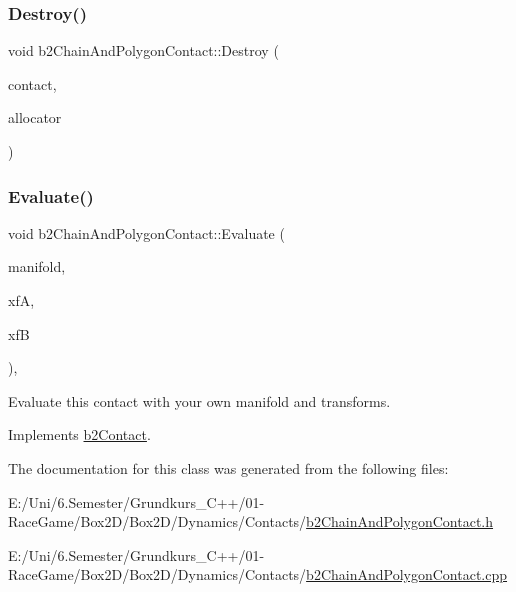 \mbox{\label{classb2_chain_and_polygon_contact_aa31bf71d64dd78583505b6da76ef289c}} 
\subsubsection{\texorpdfstring{Destroy()}{Destroy()}}
{\footnotesize\ttfamily void b2\+Chain\+And\+Polygon\+Contact\+::\+Destroy (\begin{DoxyParamCaption}\item[{\mbox{\hyperlink{classb2_contact}{b2\+Contact}} $\ast$}]{contact,  }\item[{\mbox{\hyperlink{classb2_block_allocator}{b2\+Block\+Allocator}} $\ast$}]{allocator }\end{DoxyParamCaption})\hspace{0.3cm}{\ttfamily [static]}}

\mbox{\label{classb2_chain_and_polygon_contact_a607e7a8b4b0a5ee9bfd100a365fb6f3b}} 
\subsubsection{\texorpdfstring{Evaluate()}{Evaluate()}}
{\footnotesize\ttfamily void b2\+Chain\+And\+Polygon\+Contact\+::\+Evaluate (\begin{DoxyParamCaption}\item[{\mbox{\hyperlink{structb2_manifold}{b2\+Manifold}} $\ast$}]{manifold,  }\item[{const \mbox{\hyperlink{structb2_transform}{b2\+Transform}} \&}]{xfA,  }\item[{const \mbox{\hyperlink{structb2_transform}{b2\+Transform}} \&}]{xfB }\end{DoxyParamCaption})\hspace{0.3cm}{\ttfamily [override]}, {\ttfamily [virtual]}}



Evaluate this contact with your own manifold and transforms. 



Implements \mbox{\hyperlink{classb2_contact_ae3c2842e5325b2d4500f8ed1d4de2f72}{b2\+Contact}}.



The documentation for this class was generated from the following files\+:\begin{DoxyCompactItemize}
\item 
E\+:/\+Uni/6.\+Semester/\+Grundkurs\+\_\+\+C++/01-\/\+Race\+Game/\+Box2\+D/\+Box2\+D/\+Dynamics/\+Contacts/\mbox{\hyperlink{b2_chain_and_polygon_contact_8h}{b2\+Chain\+And\+Polygon\+Contact.\+h}}\item 
E\+:/\+Uni/6.\+Semester/\+Grundkurs\+\_\+\+C++/01-\/\+Race\+Game/\+Box2\+D/\+Box2\+D/\+Dynamics/\+Contacts/\mbox{\hyperlink{b2_chain_and_polygon_contact_8cpp}{b2\+Chain\+And\+Polygon\+Contact.\+cpp}}\end{DoxyCompactItemize}
